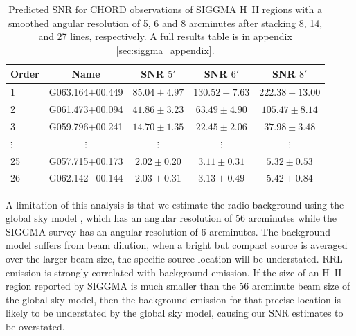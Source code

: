 \begin{table}[H]
    \centering
    \begin{tabular}{l c c c c}
        \toprule
        Order & Name & SNR $5'$ & SNR $6'$ & SNR $8'$ \\
        \midrule
        1 & G063.164$+$00.449 & $85.04 \pm 4.97$ & $130.52 \pm 7.63$ & $222.38 \pm 13.00$ \\
        2 & G061.473$+$00.094 & $41.86 \pm 3.23$ & $63.49 \pm 4.90$ & $105.47 \pm 8.14$ \\
        3 & G059.796$+$00.241 & $14.70 \pm 1.35$ & $22.45 \pm 2.06$ & $37.98 \pm 3.48$ \\
        $\vdots$ & $\vdots$ & $\vdots$ & $\vdots$ & $\vdots$ \\
        25 & G057.715$+$00.173 & $2.02 \pm 0.20$ & $3.11 \pm 0.31$ & $5.32 \pm 0.53$ \\
        26 & G062.142$-$00.144 & $2.03 \pm 0.31$ & $3.13 \pm 0.49$ & $5.42 \pm 0.84$ \\
        \bottomrule
    \end{tabular}
    \caption[SNR for CHORD observations of SIGGMA H~II regions with smoothed angular resolution]{Predicted SNR for CHORD observations of SIGGMA H~II regions with a smoothed angular resolution of 5, 6 and 8 arcminutes after stacking 8, 14, and 27 lines, respectively. A full results table is in appendix \ref{sec:siggma_appendix}.}
    \label{tab:siggma_stacked_snr_smoothed_subset}
\end{table}

A limitation of this analysis is that we estimate the radio background using the global sky model \cite{zhengImprovedModelDiffuse2017}, which has an angular resolution of 56 arcminutes while the SIGGMA survey has an angular resolution of 6 arcminutes. The background model suffers from beam dilution, when a bright but compact source is averaged over the larger beam size, the specific source location will be understated. RRL emission is strongly correlated with background emission. If the size of an H~II region reported by SIGGMA is much smaller than the 56 arcminute beam size of the global sky model, then the background emission for that precise location is likely to be understated by the global sky model, causing our SNR estimates to be overstated.
